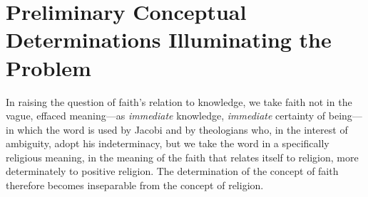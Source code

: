 \documentclass[12pt,a4paper]{book}
\begin{document}
\chapter{Preliminary Conceptual Determinations Illuminating the Problem}
\label{ch:concepts}

In raising the question of faith's relation to knowledge, we take faith not in
the vague, effaced meaning---as \emph{immediate} knowledge, \emph{immediate} certainty of
being---in which the word is used by Jacobi and by theologians who, in the
interest of ambiguity, adopt his indeterminacy, but we take the word in a
specifically religious meaning, in the meaning of the faith that relates itself
to religion, more determinately to positive religion. The determination of the
concept of faith therefore becomes inseparable from the concept of religion.
\end{document}
